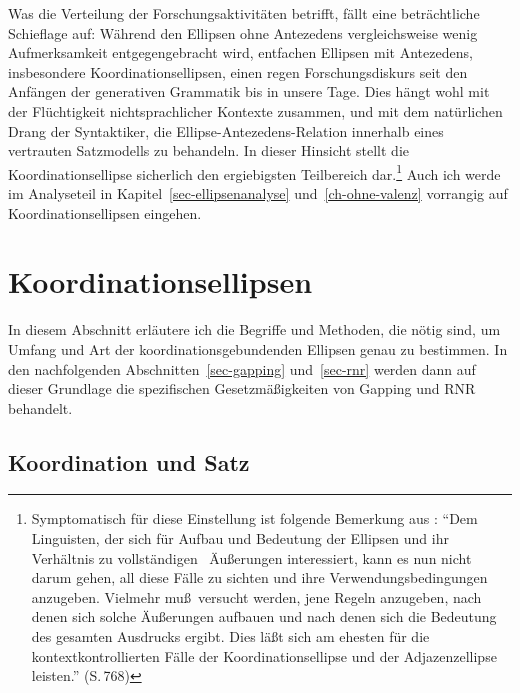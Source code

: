 Was die Verteilung der Forschungsaktivitäten betrifft, fällt eine beträchtliche Schieflage auf: Während den Ellipsen ohne Antezedens vergleichsweise wenig Aufmerksamkeit entgegengebracht wird, entfachen Ellipsen mit Antezedens, insbesondere Koordinationsellipsen, einen regen Forschungsdiskurs seit den Anfängen der generativen Grammatik bis in unsere Tage. Dies hängt wohl mit der Flüchtigkeit nichtsprachlicher Kontexte zusammen, und mit dem natürlichen Drang der Syntaktiker, die Ellipse-Antezedens-Relation innerhalb eines vertrauten Satzmodells zu behandeln. In dieser Hinsicht stellt die Koordinationsellipse sicherlich den ergiebigsten Teilbereich dar.\footnote{Symptomatisch für diese Einstellung ist folgende Bemerkung aus \cite{Klein:93}: "`Dem Linguisten, der sich für Aufbau und Bedeutung der Ellipsen und ihr Verhältnis zu \glq vollständigen\grq~ Äu\ss erungen interessiert, kann es nun nicht darum gehen, all diese Fälle zu sichten und ihre Verwendungsbedingungen anzugeben. Vielmehr mu\ss\ versucht werden, jene Regeln anzugeben, nach denen sich solche Äu\ss erungen aufbauen und nach denen sich die Bedeutung des gesamten Ausdrucks ergibt. Dies lä\ss t sich am ehesten für die kontextkontrollierten Fälle der Koordinationsellipse und der Adjazenzellipse leisten."' (S.\,768)} Auch ich werde im Analyseteil in Kapitel~\ref{sec-ellipsenanalyse} und~\ref{ch-ohne-valenz} vorrangig auf Koordinationsellipsen eingehen.  



\section{Koordinationsellipsen} \label{sec-koordinationsellipsen}

In diesem Abschnitt erläutere ich die Begriffe und Methoden, die nötig sind, um Umfang und Art der koordinationsgebundenden Ellipsen genau zu bestimmen. In den nachfolgenden Abschnitten~\ref{sec-gapping} und~\ref{sec-rnr} werden dann auf dieser Grundlage die spezifischen Gesetzmäßigkeiten von Gapping und RNR behandelt.

\subsection{Koordination und Satz}

